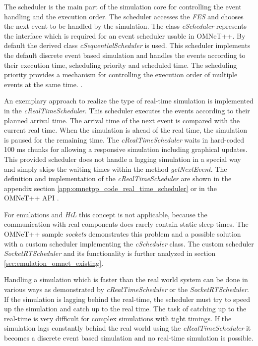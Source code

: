The scheduler is the main part of the simulation core for controlling the event handling and the execution order.
The scheduler accesses the \emph{FES} and chooses the next event to be handled by the simulation.
The class \emph{cScheduler} represents the interface which is required for an event scheduler usable in OMNeT++.
By default the derived class \emph{cSequentialScheduler} is used.
This scheduler implements the default discrete event based simulation and handles the events according to their execution time, scheduling priority and scheduled time.
The scheduling priority provides a mechanism for controlling the execution order of multiple events at the same time. \cite[section 4.1]{omnet_manual}.

An exemplary approach to realize the type of real-time simulation is implemented in the \emph{cRealTimeScheduler}.
This scheduler executes the events according to their planned arrival time.
The arrival time of the next event is compared with the current real time.
When the simulation is ahead of the real time, the simulation is paused for the remaining time.
The \emph{cRealTimeScheduler} waits in hard-coded 100 ms chunks for allowing a responsive simulation including graphical updates.
This provided scheduler does not handle a lagging simulation in a special way and simply skips the waiting times within the method \emph{getNextEvent}. 
The definition and implementation of the \emph{cRealTimeScheduler} are shown in the appendix section \ref{app:omnetpp_code_real_time_scheduler} or in the OMNeT++ API \cite[cRealTimeScheduler]{omnet_api}.

For emulations and \emph{HiL} this concept is not applicable, because the communication with real components does rarely contain static sleep times.
The OMNeT++ sample \emph{sockets} demonstrates this problem and a possible solution with a custom scheduler implementing the \emph{cScheduler} class.
The custom scheduler \emph{SocketRTScheduler} and its functionality is further analyzed in section \ref{sec:emulation_omnet_existing}.

Handling a simulation which is faster than the real world system can be done in various ways as demonstrated by \emph{cRealTimeScheduler} or the \emph{SocketRTScheduler}.
If the simulation is lagging behind the real-time, the scheduler must try to speed up the simulation and catch up to the real time.
The task of catching up to the real-time is very difficult for complex simulations with tight timings.
If the simulation lags constantly behind the real world using the \emph{cRealTimeScheduler} it becomes a discrete event based simulation and no real-time simulation is possible.

